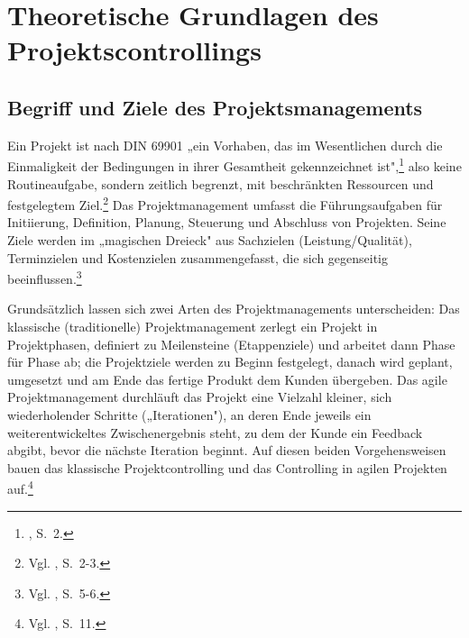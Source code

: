 \documentclass[
    12pt, 
    a4paper,
    ]{scrartcl} %
\begin{document}
\section{Theoretische Grundlagen des Projektscontrollings}

\subsection{Begriff und Ziele des Projektsmanagements}
Ein Projekt ist nach DIN 69901 „ein Vorhaben, das im Wesentlichen durch die Einmaligkeit der Bedingungen in ihrer Gesamtheit gekennzeichnet ist",\footnote{\cite{Feidler_ControllingVonProjekten}, S.~2.} also keine Routineaufgabe, sondern zeitlich begrenzt, mit beschränkten Ressourcen und festgelegtem Ziel.\footnote{Vgl. \cite{Feidler_ControllingVonProjekten}, S.~2-3.} Das Projektmanagement umfasst die Führungsaufgaben für Initiierung, Definition, Planung, Steuerung und Abschluss von Projekten. Seine Ziele werden im „magischen Dreieck" aus Sachzielen (Leistung/Qualität), Terminzielen und Kostenzielen zusammengefasst, die sich gegenseitig beeinflussen.\footnote{Vgl. \cite{Feidler_ControllingVonProjekten}, S.~5-6.}

Grundsätzlich lassen sich zwei Arten des Projektmanagements unterscheiden: Das klassische (traditionelle) Projektmanagement zerlegt ein Projekt in Projektphasen, definiert zu Meilensteine (Etappenziele) und arbeitet dann Phase für Phase ab; die Projektziele werden zu Beginn festgelegt, danach wird geplant, umgesetzt und am Ende das fertige Produkt dem Kunden übergeben. Das agile Projektmanagement durchläuft das Projekt eine Vielzahl kleiner, sich wiederholender Schritte („Iterationen"), an deren Ende jeweils ein weiterentwickeltes Zwischenergebnis steht, zu dem der Kunde ein Feedback abgibt, bevor die nächste Iteration beginnt. Auf diesen beiden Vorgehensweisen bauen das klassische Projektcontrolling und das Controlling in agilen Projekten auf.\footnote{Vgl. \cite{Beiderwieden_ProjektmanagementIT}, S.~11.}
\end{document}
